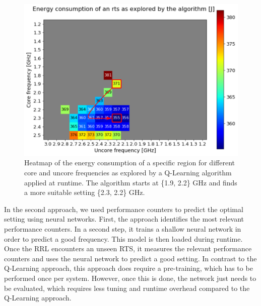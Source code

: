 \begin{figure}[!t]
\centering
\includegraphics[width=.8\columnwidth]{figures/q_learning.png}
\caption{Heatmap of the energy consumption of a specific region for different core and uncore frequencies as explored by a Q-Learning algorithm applied at runtime. The algorithm starts at \{1.9, 2.2\} GHz and finds a more suitable setting \{2.3, 2.2\} GHz.}
\label{fig:qlearning}
\end{figure}

In the second approach, we used performance counters to predict the optimal setting using neural networks. First, the approach identifies the most relevant performance counters. In a second step, it trains a shallow neural network in order to predict a good frequency. This model is then loaded during runtime. Once the RRL encounters an unseen RTS, it measures the relevant performance counters and uses the neural network to predict a good setting. In contrast to the Q-Learning approach, this approach does require a pre-training, which has to be performed once per system. However, once this is done, the network just needs to be evaluated, which requires less tuning and runtime overhead compared to the Q-Learning approach. 



